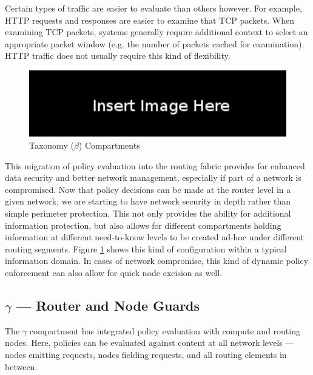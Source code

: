 \documentclass[12pt,letterpaper]{article}
\begin{document}
Certain types of traffic are easier to evaluate than others however.  For example, HTTP requests and responses are easier to examine that TCP packets.  When examining TCP packets, systems generally require additional context to select an appropriate packet window (e.g. the number of packets cached for examination).  HTTP traffic does not usually require this kind of flexibility.

\begin{figure}[!t]
\centering
\includegraphics[width=5in]{blank}
\caption{Taxonomy ($\beta$) Compartments}
\label{fig:model:taxonomy-beta-compartment}
\end{figure}

This migration of policy evaluation into the routing fabric provides for enhanced data security and better network management, especially if part of a network is compromised.  Now that policy decisions can be made at the router level in a given network, we are starting to have network security in depth rather than simple perimeter protection.  This not only provides the ability for additional information protection, but also allows for different compartments holding information at different need-to-know levels to be created ad-hoc under different routing segments.  Figure \ref{fig:model:taxonomy-beta-compartment} shows this kind of configuration within a typical information domain.  In cases of network compromise, this kind of dynamic policy enforcement can also allow for quick node excision as well.

\subsection{$\gamma$ ---  Router and Node Guards}
The $\gamma$ compartment has integrated policy evaluation with compute and routing nodes.  Here, policies can be evaluated against content at all network levels --- nodes emitting requests, nodes fielding requests, and all routing elements in between.
\end{document}
